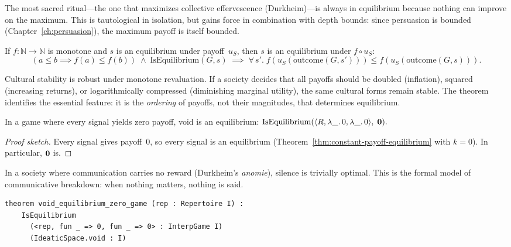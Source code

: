 The most sacred ritual---the one that maximizes collective effervescence
(Durkheim)---is always in equilibrium because nothing can improve on the
maximum.  This is tautological in isolation, but gains force in combination
with depth bounds: since persuasion is bounded (Chapter~\ref{ch:persuasion}),
the maximum payoff is itself bounded.

\begin{theorem}
\label{thm:equilibrium-monotone}
If $f:\mathbb{N}\to\mathbb{N}$ is monotone and $s$ is an equilibrium under
payoff~$u_S$, then $s$ is an equilibrium under $f\circ u_S$:
\[
  (a\le b \implies f(a)\le f(b))
  \;\wedge\;
  \mathrm{IsEquilibrium}(G,s)
  \;\implies\;
  \forall\,s'.\; f(u_S(\mathrm{outcome}(G,s'))) \le f(u_S(\mathrm{outcome}(G,s))).
\]
\end{theorem}

Cultural stability is robust under monotone revaluation.  If a society
decides that all payoffs should be doubled (inflation), squared (increasing
returns), or logarithmically compressed (diminishing marginal utility), the
same cultural forms remain stable.  The theorem identifies the essential
feature: it is the \emph{ordering} of payoffs, not their magnitudes, that
determines equilibrium.

\begin{theorem}
\label{thm:void-equilibrium-zero}
In a game where every signal yields zero payoff, void is an equilibrium:
$\mathrm{IsEquilibrium}(\langle R, \lambda\_.\,0, \lambda\_.\,0\rangle,\;\mathbf{0}).$
\end{theorem}

\begin{proof}[Proof sketch]
Every signal gives payoff~$0$, so every signal is an equilibrium
(Theorem~\ref{thm:constant-payoff-equilibrium} with $k=0$).  In particular,
$\mathbf{0}$ is.
\end{proof}

In a society where communication carries no reward (Durkheim's \emph{anomie}),
silence is trivially optimal.  This is the formal model of communicative
breakdown: when nothing matters, nothing is said.

\begin{lstlisting}[caption={Void equilibrium in zero-payoff games.}]
theorem void_equilibrium_zero_game (rep : Repertoire I) :
    IsEquilibrium
      (<rep, fun _ => 0, fun _ => 0> : InterpGame I)
      (IdeaticSpace.void : I)
\end{lstlisting}


